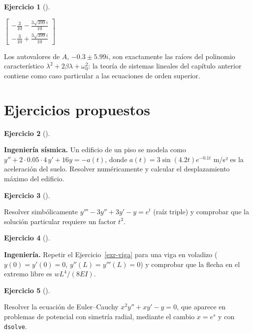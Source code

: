 \documentclass[
  spanish,
  a4paper,
]{scrreport}
\theoremstyle{definition}
\newtheorem{exercise}{Ejercicio}[chapter]
\theoremstyle{remark}
\begin{document}
\begin{exercise}[]
\begin{tcolorbox}
$\left[\begin{smallmatrix}- \frac{3}{10} - \frac{3 \sqrt{399} i}{10}\\- \frac{3}{10} + \frac{3 \sqrt{399} i}{10}\end{smallmatrix}\right]$

Los autovalores de \(A\), \(-0.3 \pm 5.99i\), son exactamente las raíces
del polinomio característico \(\lambda^2 + 2\beta\lambda + \omega_0^2\):
la teoría de sistemas lineales del capítulo anterior contiene como caso
particular a las ecuaciones de orden superior.

\end{tcolorbox}

\end{exercise}

\section{Ejercicios propuestos}\label{ejercicios-propuestos-3}

\begin{exercise}[]\protect\hypertarget{exr-propuesto-sismo}{}\label{exr-propuesto-sismo}

\textbf{Ingeniería sísmica.} Un edificio de un piso se modela como
\(y'' + 2\cdot 0.05\cdot 4\, y' + 16 y = -a(t)\), donde
\(a(t) = 3\sin(4.2t)e^{-0.1t}\) m/s² es la aceleración del suelo.
Resolver numéricamente y calcular el desplazamiento máximo del edificio.

\end{exercise}

\begin{exercise}[]\protect\hypertarget{exr-propuesto-tercera}{}\label{exr-propuesto-tercera}

Resolver simbólicamente \(y''' - 3y'' + 3y' - y = e^t\) (raíz triple) y
comprobar que la solución particular requiere un factor \(t^3\).

\end{exercise}

\begin{exercise}[]\protect\hypertarget{exr-propuesto-voladizo}{}\label{exr-propuesto-voladizo}

\textbf{Ingeniería.} Repetir el Ejercicio~\ref{exr-viga} para una viga
en voladizo (\(y(0)=y'(0)=0\), \(y''(L)=y'''(L)=0\)) y comprobar que la
flecha en el extremo libre es \(wL^4/(8EI)\).

\end{exercise}

\begin{exercise}[]\protect\hypertarget{exr-propuesto-euler}{}\label{exr-propuesto-euler}

Resolver la ecuación de Euler--Cauchy \(x^2y'' + xy' - y = 0\), que
aparece en problemas de potencial con simetría radial, mediante el
cambio \(x=e^s\) y con \texttt{dsolve}.

\end{exercise}
\end{document}
